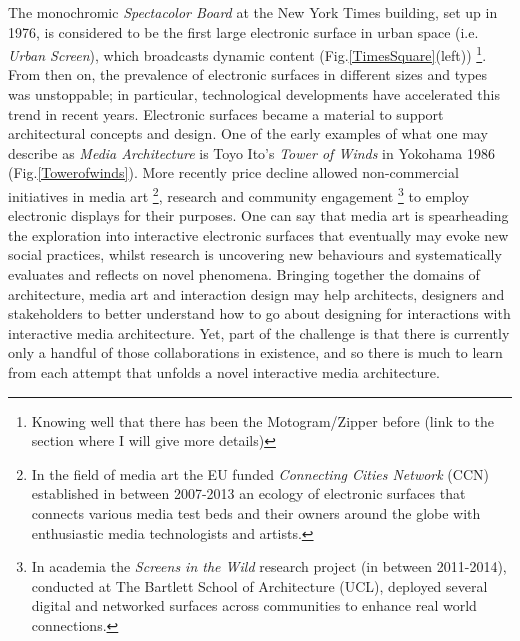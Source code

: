 The monochromic \textit{Spectacolor Board}  at the New York Times building, set up in 1976, is considered to be the first large electronic surface in urban space (i.e. \textit{Urban Screen}), which broadcasts dynamic content (Fig.\ref{TimesSquare}(left)) \footnote{Knowing well that there has been the Motogram/Zipper before (link to the section where I will give more details)}. 
From then on, the prevalence of electronic surfaces in different sizes and types was unstoppable; in particular, technological developments have accelerated this trend in recent years. 
Electronic surfaces became a material to support architectural concepts and design. One of the early examples of what one may describe as \textit{Media Architecture} is Toyo Ito's \textit{Tower of Winds}  in Yokohama 1986 (Fig.\ref{Towerofwinds}).  More recently price decline allowed non-commercial initiatives in media art \footnote{In the field of media art the EU funded \textit{Connecting Cities Network} (CCN)  established in between 2007-2013 an ecology of electronic surfaces that connects various media test beds and their owners around the globe with enthusiastic media technologists and artists.}, research and community engagement \footnote{In academia the \textit{Screens in the Wild}  research project (in between 2011-2014), conducted at The Bartlett School of Architecture (UCL), deployed several digital and networked surfaces across communities to enhance real world connections.} to employ electronic displays for their purposes. 
One can say that media art is spearheading the exploration into interactive electronic surfaces that eventually may evoke new social practices, whilst research is uncovering new behaviours and systematically evaluates and reflects on novel phenomena.
Bringing together the domains of architecture, media art and interaction design may help architects, designers and stakeholders to better understand how to go about designing for interactions with interactive media architecture. 
Yet, part of the challenge is that there is currently only a handful of those collaborations in existence, and so there is much to learn from each attempt that unfolds a novel interactive media architecture. 



